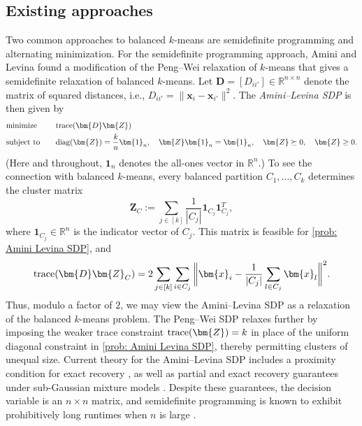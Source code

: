 \documentclass{article}
\theoremstyle{plain}
\theoremstyle{definition}
\newcommand{\1}{\mathbf{1}}
\newcommand{\trace}{\textnormal{trace}}
\newcommand{\diag}{\textnormal{diag}}
\begin{document}
\subsection{Existing approaches}

Two common approaches to balanced $k$-means are semidefinite programming and alternating minimization.
For the semidefinite programming approach, Amini and Levina \cite{amini2018semidefinite} found a modification of the Peng--Wei relaxation of $k$-means \cite{peng2007approximating} that gives a semidefinite relaxation of balanced $k$-means.
Let $\bm{D}=[D_{ii'}]\in\mathbb{R}^{n\times n}$ denote the matrix of squared distances, i.e., $D_{ii'}=\|\bm{x}_i-\bm{x}_{i'}\|^2$.
The \textit{Amini--Levina SDP} is then given by
\begin{equation}
\label{prob: Amini Levina SDP}
\begin{aligned}
& \text{minimize} &&\quad \trace(\bm{D}\bm{Z}) \\
& \text{subject to} && \quad \diag(\bm{Z}) = \frac{k}{n}\bm{1}_n, \quad \bm{Z}\bm{1}_n  = \bm{1}_n, \quad \bm{Z} \succeq 0, \quad \bm{Z}\ge 0.
\end{aligned}
\end{equation}
(Here and throughout, $\bm{1}_n$ denotes the all-ones vector in $\mathbb{R}^n$.)
To see the connection with balanced $k$-means, every balanced partition $C_1,\ldots,C_k$ determines the cluster matrix
\[
\bm{Z}_C:=\sum_{j\in[k]}\frac{1}{|C_j|}\bm{1}_{C_j}\bm{1}_{C_j}^T,
\]
where $\bm{1}_{C_j}\in\mathbb{R}^n$ is the indicator vector of $C_j$.
This matrix is feasible for \eqref{prob: Amini Levina SDP}, and
\[
\trace(\bm{D}\bm{Z}_C)
=2\sum_{j\in[k]}\sum_{i\in C_j}\bigg\|\bm{x}_i-\frac{1}{|C_j|}\sum_{l\in C_j}\bm{x}_l\bigg\|^2.
\]
Thus, modulo a factor of $2$, we may view the Amini--Levina SDP as a relaxation of the balanced $k$-means problem.
The Peng--Wei SDP relaxes further by imposing the weaker trace constraint $\trace(\bm{Z})=k$ in place of the uniform diagonal constraint in \eqref{prob: Amini Levina SDP}, thereby permitting clusters of unequal size.
Current theory for the Amini--Levina SDP includes a proximity condition for exact recovery \cite{li2020when}, as well as partial and exact recovery guarantees under sub-Gaussian mixture models \cite{fei2022hidden}.
Despite these guarantees, the decision variable is an $n\times n$ matrix, and semidefinite programming is known to exhibit prohibitively long runtimes when $n$ is large \cite{majumdar2020recent}.
\end{document}
